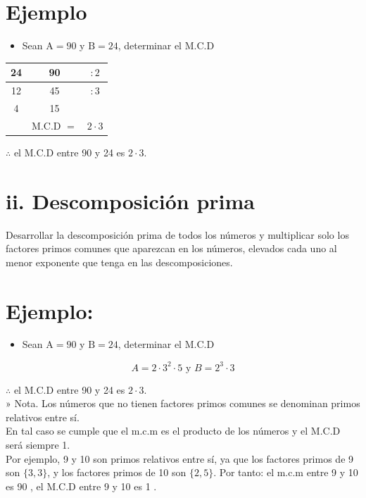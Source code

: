 \documentclass[10pt]{article}
\begin{document}
\section*{Ejemplo}
\begin{itemize}
  \item Sean $\mathrm{A}=90$ y $\mathrm{B}=24$, determinar el M.C.D
\end{itemize}

\begin{center}
\begin{tabular}{cc|c}
24 & 90 & $: 2$ \\
\hline
12 & 45 & $: 3$ \\
4 & 15 &  \\
\hline
 & M.C.D $=$ & $2 \cdot 3$ \\
\hline
\end{tabular}
\end{center}

$\therefore$ el M.C.D entre 90 y 24 es $2 \cdot 3$.

\section*{ii. Descomposición prima}
Desarrollar la descomposición prima de todos los números y multiplicar solo los factores primos comunes que aparezcan en los números, elevados cada uno al menor exponente que tenga en las descomposiciones.

\section*{Ejemplo:}
\begin{itemize}
  \item Sean $\mathrm{A}=90$ y $\mathrm{B}=24$, determinar el M.C.D
\end{itemize}

$$
A=2 \cdot 3^{2} \cdot 5 \text { y } B=2^{3} \cdot 3
$$

$\therefore$ el M.C.D entre 90 y 24 es $2 \cdot 3$.\\
» Nota. Los números que no tienen factores primos comunes se denominan primos relativos entre sí.\\
En tal caso se cumple que el m.c.m es el producto de los números y el M.C.D será siempre 1.\\
Por ejemplo, 9 y 10 son primos relativos entre sí, ya que los factores primos de 9 son $\{3,3\}$, y los factores primos de 10 son $\{2,5\}$. Por tanto: el m.c.m entre 9 y 10 es 90 , el M.C.D entre 9 y 10 es 1 .
\end{document}
